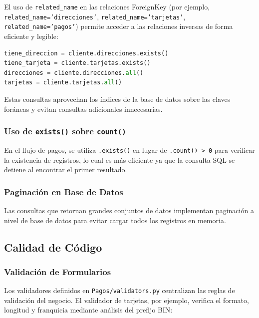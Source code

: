 \documentclass[12pt, a4paper]{article}
\begin{document}
{El uso de \texttt{related\_name} en las relaciones ForeignKey (por ejemplo, \texttt{related\_name='direcciones'}, \texttt{related\_name='tarjetas'}, \texttt{related\_name='pagos'}) permite acceder a las relaciones inversas de forma eficiente y legible:

\begin{lstlisting}[language=Python, caption={Uso de related\_name para consultas eficientes}]
tiene_direccion = cliente.direcciones.exists()
tiene_tarjeta = cliente.tarjetas.exists()
direcciones = cliente.direcciones.all()
tarjetas = cliente.tarjetas.all()
\end{lstlisting}

Estas consultas aprovechan los índices de la base de datos sobre las claves foráneas y evitan consultas adicionales innecesarias.

\subsubsection{Uso de \texttt{exists()} sobre \texttt{count()}}

En el flujo de pagos, se utiliza \texttt{.exists()} en lugar de \texttt{.count() > 0} para verificar la existencia de registros, lo cual es más eficiente ya que la consulta SQL se detiene al encontrar el primer resultado.

\subsubsection{Paginación en Base de Datos}

Las consultas que retornan grandes conjuntos de datos implementan paginación a nivel de base de datos para evitar cargar todos los registros en memoria.

\subsection{Calidad de Código}

\subsubsection{Validación de Formularios}

Los validadores definidos en \texttt{Pagos/validators.py} centralizan las reglas de validación del negocio. El validador de tarjetas, por ejemplo, verifica el formato, longitud y franquicia mediante análisis del prefijo BIN:

}
\end{document}
